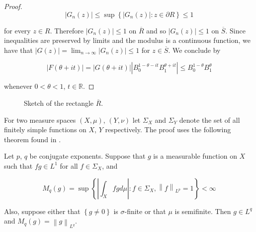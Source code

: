 \begin{proof}
\begin{equation*}
	\left| G_n(z)\right| \leqslant \sup\left\{ \left|G_n(z) \right| : z \in \partial R \right\} \leqslant 1
\end{equation*}

for every $z \in R$. Therefore $\left| G_n(z) \right| \leqslant 1$ on $\overline{R}$ and so $\left| G_n(z) \right| \leqslant 1$ on $\overline{S}$. Since inequalities are preserved by limits and the modulus is a continuous function, we have that $\left| G(z) \right| = \lim_{n \to \infty} \left| G_n(z) \right| \leqslant 1$ for $z \in \overline{S}$. We conclude by 

\begin{equation*}
	\left| F(\theta + it) \right| = \left| G(\theta + it) \right| \left| B_0^{1 - \theta - it}B_1^{\theta + it}\right| \leqslant B_0^{1 - \theta} B_1^{\theta}
\end{equation*}

whenever $0 < \theta < 1$, $t \in \mathbb{R}$.
\end{proof}


\begin{figure}[h!tb]
	\centering
	\caption{Sketch of the rectangle $\overline{R}$.}
	\label{fig:Hadamards_three_lines_lemma}
\end{figure}

For two measure spaces $\left( X,\mu \right)$, $\left( Y,\nu \right)$ let $\Sigma_X$ and $\Sigma_Y$ denote the set of all finitely simple functions on $X$, $Y$ respectively. The proof uses the following theorem found in \cite[189]{folland:real_analysis:1999}.

\begin{theorem*}
	Let $p$, $q$ be conjugate exponents. Suppose that $g$ is a measurable function on $X$ such that $fg \in L^1$ for all $f \in \Sigma_X$, and 

	\begin{equation*}
		M_q(g) = \sup\left\{ \left| \int_X fg d\mu\right| : f \in \Sigma_X, \left\| f\right\|_{L^p} = 1\right\} < \infty
	\end{equation*}

	Also, suppose either that $\left\{ g \neq 0\right\}$ is $\sigma$-finite or that $\mu$ is semifinite. Then $g \in L^q$ and $M_q(g) = \left\| g\right\|_{L^q}$.
\end{theorem*}

